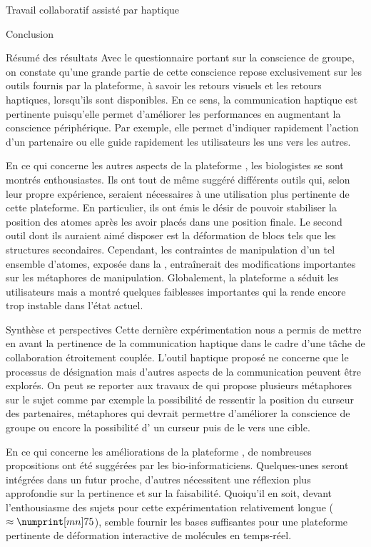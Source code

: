 \documentclass[myfrancais,ngerman,english,french]{mythesis}
\begin{document}
\begin{mychapter}{Travail collaboratif assisté par haptique}
\begin{mysection}{Conclusion}
\begin{mysubsection}{Résumé des résultats}
				Avec le questionnaire portant sur la conscience de groupe, on constate qu'une grande partie de cette conscience repose exclusivement sur les outils fournis par la plateforme, à savoir les retours visuels et les retours haptiques, lorsqu'ils sont disponibles.
				En ce sens, la communication haptique est pertinente puisqu'elle permet d'améliorer les performances en augmentant la conscience périphérique.
				Par exemple, elle permet d'indiquer rapidement l'action d'un partenaire ou elle guide rapidement les utilisateurs les uns vers les autres.

				En ce qui concerne les autres aspects de la plateforme \myShaddock, les biologistes se sont montrés enthousiastes.
				Ils ont tout de même suggéré différents outils qui, selon leur propre expérience, seraient nécessaires à une utilisation plus pertinente de cette plateforme.
				En particulier, ils ont émis le désir de pouvoir stabiliser la position des atomes après les avoir placés dans une position finale.
				Le second outil dont ils auraient aimé disposer est la déformation de blocs tels que les structures secondaires.
				Cependant, les contraintes de manipulation d'un tel ensemble d'atomes, exposée dans la , entraînerait des modifications importantes sur les métaphores de manipulation.
				Globalement, la plateforme a séduit les utilisateurs mais a montré quelques faiblesses importantes qui la rende encore trop instable dans l'état actuel.
			\end{mysubsection}
			\begin{mysubsection}{Synthèse et perspectives}
				Cette dernière expérimentation nous a permis de mettre en avant la pertinence de la communication haptique dans le cadre d'une tâche de collaboration étroitement couplée.
				L'outil haptique proposé ne concerne que le processus de désignation mais d'autres aspects de la communication peuvent être explorés.
				On peut se reporter aux travaux de  qui propose plusieurs métaphores sur le sujet comme par exemple la possibilité de ressentir la position du curseur des partenaires, métaphores qui devrait permettre d'améliorer la conscience de groupe ou encore la possibilité d' un curseur puis de le  vers une cible.

				En ce qui concerne les améliorations de la plateforme \myShaddock, de nombreuses propositions ont été suggérées par les bio-informaticiens.
				Quelques-unes seront intégrées dans un futur proche, d'autres nécessitent une réflexion plus approfondie sur la pertinence et sur la faisabilité.
				Quoiqu'il en soit, devant l'enthousiasme des sujets pour cette expérimentation relativement longue ($\approx \mynum[mn]{75}$), \myShaddock semble fournir les bases suffisantes pour une plateforme pertinente de déformation interactive de molécules en temps-réel.
			\end{mysubsection}
		\end{mysection}
	\end{mychapter}
\end{document}
